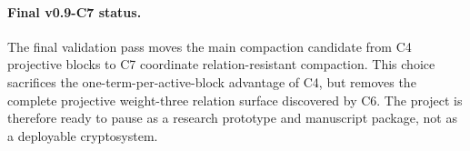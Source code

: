 \paragraph{Final v0.9-C7 status.}
The final validation pass moves the main compaction candidate from C4 projective
blocks to C7 coordinate relation-resistant compaction.  This choice sacrifices
the one-term-per-active-block advantage of C4, but removes the complete
projective weight-three relation surface discovered by C6.  The project is
therefore ready to pause as a research prototype and manuscript package, not as
a deployable cryptosystem.
